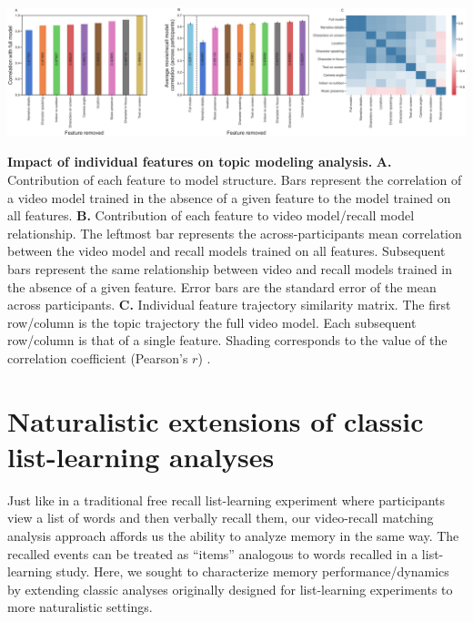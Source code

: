 \documentclass{article}
\begin{document}
\begin{suppfigure}[t!]
\centering
\includegraphics[width=1\textwidth]{figs/supp4_feature_value.pdf}
\caption{\small \textbf{Impact of individual features on topic modeling analysis.} \textbf{A.} Contribution of each feature to model structure. Bars represent the correlation of a video model trained in the absence of a given feature to the model trained on all features. \textbf{B.} Contribution of each feature to video model/recall model relationship. The leftmost bar represents the across-participants mean correlation between the video model and recall models trained on all features. Subsequent bars represent the same relationship between video and recall models trained in the absence of a given feature. Error bars are the standard error of the mean across participants. \textbf{C.}  Individual feature trajectory similarity matrix. The first row/column is the topic trajectory the full video model. Each subsequent row/column is that of a single feature. Shading corresponds to the value of the correlation coefficient (Pearson's $r$) .}
\label{fig:feature-importance}
\end{suppfigure}

\section*{Naturalistic extensions of classic list-learning analyses}
Just like in a traditional free recall list-learning experiment where participants view a list of words and then verbally recall them, our video-recall matching analysis approach affords us the ability to analyze memory in the same way. The recalled events can be treated as ``items'' analogous to words recalled in a list-learning study. Here, we sought to characterize memory performance/dynamics by extending classic analyses originally designed for list-learning experiments to more naturalistic settings.
\end{document}
